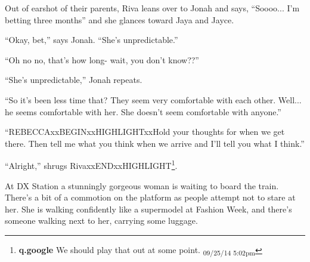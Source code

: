 Out of earshot of their parents, Riva leans over to Jonah and says, ``Soooo... I'm betting three months'' and she glances toward Jaya and Jayce.

``Okay, bet,'' says Jonah.  ``She's unpredictable.''

``Oh no no, that's how long- wait, you don't know??''

``She's unpredictable,'' Jonah repeats.

``So it's been less time that?  They seem very comfortable with each other.  Well... he seems comfortable with her.  She doesn't seem comfortable with anyone.''

``REBECCAxxBEGINxxHIGHLIGHTxxHold your thoughts for when we get there.  Then tell me what you think when we arrive and I'll tell you what I think.''

``Alright,'' shrugs RivaxxENDxxHIGHLIGHT\footnote{\textbf{q.google }We should play that out at some point. \textsubscript{09/25/14 5:02pm}}.



At DX Station a stunningly gorgeous woman is waiting to board the train.  There's a bit of a commotion on the platform as people attempt not to stare at her.  She is walking confidently like a supermodel at Fashion Week, and there's someone walking next to her, carrying some luggage.  



